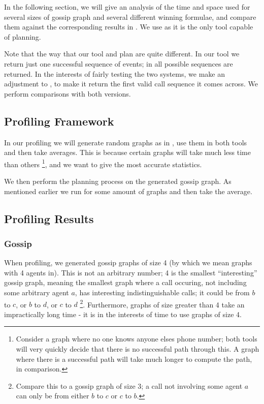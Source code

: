 \documentclass[10pt, a4paper]{report}
\begin{document}
In the following section, we will give an analysis of the time and space used
for several sizes of gossip graph and several different winning formulae, and
compare them against the corresponding results in \cite{GithubGossip}. We use
\cite{GithubGossip} as it is the only tool capable of planning.

Note that the way that our tool and \cite{GithubGossip} plan are quite
different. In our tool we return just one successful sequence of events; in
\cite{GithubGossip} all possible sequences are returned. In the interests of
fairly testing the two systems, we make an adjustment to \cite{GithubGossip}, to
make it return the first valid call sequence it comes across. We perform
comparisons with both versions.

\subsection{Profiling Framework}

In our profiling we will generate random graphs as in
, use them in both tools and then take averages.
This is because certain graphs will take much less time than others
\footnote{Consider a graph where no one knows anyone elses phone number; both
  tools will very quickly decide that there is no successful path through this.
  A graph where there is a successful path will take much longer to compute the
  path, in comparison.}, and we want to give the most accurate statistics.

We then perform the planning process on the generated gossip graph. As mentioned
earlier we run for some amount of graphs and then take the average.

\subsection{Profiling Results}

\subsubsection{Gossip}

When profiling, we generated gossip graphs of size 4 (by which we mean graphs
with 4 agents in). This is not an arbitrary number; 4 is the smallest
``interesting'' gossip graph, meaning the smallest graph where a call occuring,
not including some arbitrary agent $a$, has interesting indistinguishable calls;
it could be from $b$ to $c$, or $b$ to $d$, or $c$ to $d$ \footnote{Compare this
  to a gossip graph of size 3; a call not involving some agent $a$ can only be
  from either $b$ to $c$ or $c$ to $b$.}. Furthermore, graphs of size greater
than 4 take an impractically long time - it is in the interests of time to use
graphs of size 4.
\end{document}

